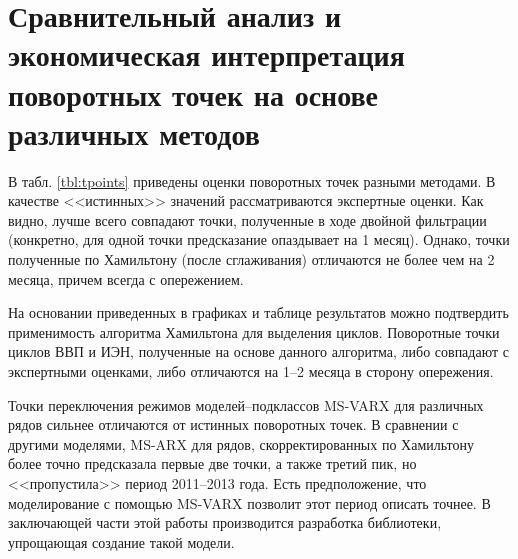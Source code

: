 \documentclass[a4paper,14pt]{extreport}
\begin{document}
	\section{Сравнительный анализ и экономическая интерпретация поворотных точек на основе различных методов }
	
	
	В табл. \ref{tbl:tpoints} приведены оценки поворотных точек разными методами. В качестве <<истинных>> значений рассматриваются экспертные оценки. Как видно, лучше всего совпадают точки, полученные в ходе двойной фильтрации (конкретно, для одной точки предсказание опаздывает на 1 месяц). Однако, точки полученные по Хамильтону (после сглаживания) отличаются не более чем на 2 месяца, причем всегда с опережением.
	
	На основании приведенных в графиках и таблице результатов можно подтвердить применимость алгоритма Хамильтона для выделения циклов. Поворотные точки циклов ВВП и ИЭН, полученные на основе данного алгоритма, либо совпадают с экспертными оценками, либо отличаются на 1–2 месяца в сторону опережения.
	
	Точки переключения режимов моделей–подклассов MS-VARX для различных рядов сильнее отличаются от истинных поворотных точек. В сравнении с другими моделями, MS-ARX для рядов, скорректированных по Хамильтону более точно предсказала первые две точки, а также третий пик, но <<пропустила>> период 2011–2013 года. Есть предположение, что моделирование с помощью MS-VARX позволит этот период описать точнее. В заключающей части этой работы производится разработка библиотеки, упрощающая создание такой модели.
	
	
	
\end{document}
